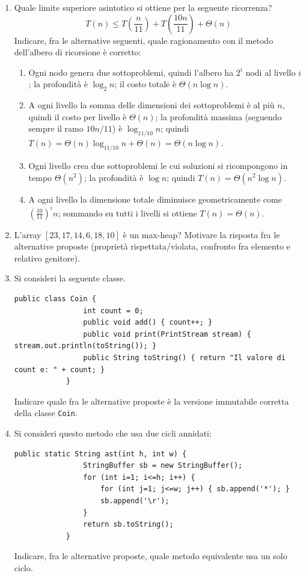 \begin{enumerate}
		\item Quale limite superiore asintotico si ottiene per la seguente ricorrenza?
		\[
		T(n) \le T\!\left(\frac{n}{11}\right) + T\!\left(\frac{10n}{11}\right) + \Theta(n)
		\]
		Indicare, fra le alternative seguenti, quale ragionamento con il metodo dell'albero di ricorsione è corretto:
		\begin{enumerate}[label=(\alph*)]
			\item Ogni nodo genera due sottoproblemi, quindi l'albero ha $2^i$ nodi al livello $i$; la profondità è $\log_2 n$; il costo totale è $\Theta(n\log n)$.
			\item A ogni livello la somma delle dimensioni dei sottoproblemi è al più $n$, quindi il costo per livello è $\Theta(n)$; la profondità massima (seguendo sempre il ramo $10n/11$) è $\log_{11/10} n$; quindi $T(n)=\Theta(n)\log_{11/10}n+\Theta(n)=\Theta(n\log n)$.
			\item Ogni livello crea due sottoproblemi le cui soluzioni si ricompongono in tempo $\Theta(n^2)$; la profondità è $\log n$; quindi $T(n)=\Theta(n^2\log n)$.
			\item A ogni livello la dimensione totale diminuisce geometricamente come $\left(\frac{10}{11}\right)^i n$; sommando su tutti i livelli si ottiene $T(n)=\Theta(n)$.
		\end{enumerate}
		
		\item L'array $[23,17,14,6,18,10]$ è un max-heap? Motivare la risposta fra le alternative proposte (proprietà rispettata/violata, confronto fra elemento e relativo genitore).
		
		\item Si consideri la seguente classe.
		\begin{lstlisting}[style=java]
			public class Coin {
				int count = 0;
				public void add() { count++; }
				public void print(PrintStream stream) { stream.out.println(toString()); }
				public String toString() { return "Il valore di count e: " + count; }
			}
		\end{lstlisting}
		Indicare quale fra le alternative proposte è la versione immutabile corretta della classe \texttt{Coin}.
		
		\item Si consideri questo metodo che usa due cicli annidati:
		\begin{lstlisting}[style=java]
			public static String ast(int h, int w) {
				StringBuffer sb = new StringBuffer();
				for (int i=1; i<=h; i++) {
					for (int j=1; j<=w; j++) { sb.append('*'); }
					sb.append('\r');
				}
				return sb.toString();
			}
		\end{lstlisting}
		Indicare, fra le alternative proposte, quale metodo equivalente usa un solo ciclo.
		

\end{enumerate}

